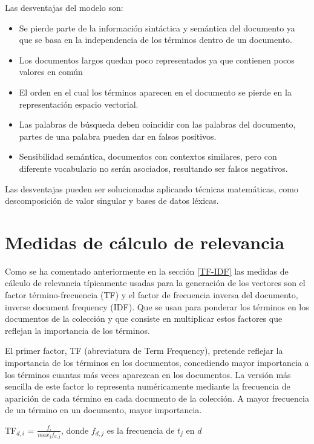 \documentclass[titlepage]{article}
\begin{document}
Las desventajas del modelo son:

\begin{itemize}
	\item Se pierde parte de la información sintáctica y semántica del documento ya que se basa en la independencia de los términos dentro de un documento. 
	\item Los documentos largos quedan poco representados ya que contienen pocos valores en común 
	\item El orden en el cual los términos aparecen en el documento se pierde en la representación espacio vectorial. 
	\item Las palabras de búsqueda deben coincidir con las palabras del documento, partes de una palabra pueden dar en falsos positivos. 
	\item Sensibilidad semántica, documentos con contextos similares, pero con diferente vocabulario no serán asociados, resultando ser falsos negativos. 
\end{itemize}

Las desventajas pueden ser solucionadas aplicando técnicas matemáticas, como descomposición de valor singular y bases de datos léxicas.

\section{Medidas de cálculo de relevancia}	\label{sec:Medidas de cálculo de relevancia}

Como se ha comentado anteriormente en la sección \ref{TF-IDF} las medidas de cálculo de relevancia típicamente usadas para la generación de los vectores son el factor término-frecuencia (TF) y el factor de frecuencia inversa del documento, inverse document frequency (IDF). Que se usan para ponderar los términos en los documentos de la colección y que consiste en multiplicar estos factores que reflejan la importancia de los términos.

El primer factor, TF (abreviatura de Term Frequency), pretende reflejar la importancia de los términos en los documentos, concediendo mayor importancia a los términos cuantas más veces aparezcan en los documentos. La versión más sencilla de este factor lo representa numéricamente mediante la frecuencia de aparición de cada término en cada documento de la colección. A mayor frecuencia de un término en un documento, mayor
importancia.

\begin{center}
	TF$_{d, i}$ = $\frac{f_{i}}{max_{j} f_{d, j}}$, 
	donde $f_{d, j}$ es la frecuencia de $t_{j}$ en $d$
\end{center}
\end{document}
